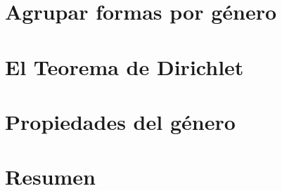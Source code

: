 \section{Agrupar formas por g\'enero}\label{sec:agrupar}


\section{El Teorema de Dirichlet}\label{sec:dirichlet}


\section{Propiedades del g\'enero}\label{sec:propiedades}


\section{Resumen}\label{sec:resumen}


